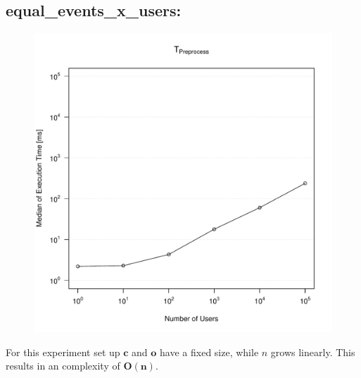 \documentclass[10pt,a4paper]{article}
\begin{document}
	\subsection{equal\_events\_x\_users:}
	\begin{figure}[H]
		\centering
		\includegraphics[scale=0.7]{graphics/TPreprocess_median_equal_events.pdf}
	\end{figure}
	For this experiment set up $\mathbf{c}$ and $\mathbf{o}$ have a fixed size, while $n$ grows linearly. This results in an complexity of $\mathbf{O(n)}$.
	
\end{document}
